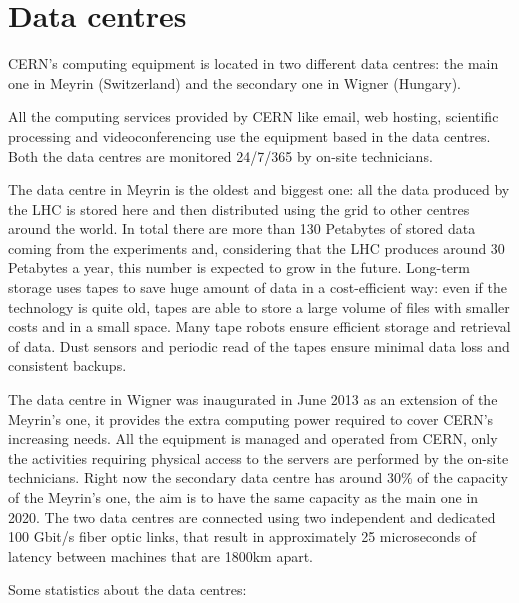 \section{Data centres}

CERN's computing equipment is located in two different data centres: the
main one in Meyrin (Switzerland) and the secondary one in Wigner
(Hungary).

All the computing services provided by CERN like email, web hosting,
scientific processing and videoconferencing use the equipment based in the
data centres. Both the data centres are monitored 24/7/365 by on-site
technicians.

The data centre in Meyrin is the oldest and biggest one: all the data
produced by the LHC is stored here and then distributed using the grid to
other centres around the world. In total there are more than 130 Petabytes
of stored data coming from the experiments and, considering that the LHC
produces around 30 Petabytes a year, this number is expected to grow in
the future. Long-term storage uses tapes to save huge amount of data in
a cost-efficient way: even if the technology is quite old, tapes are
able to store a large volume of files with smaller costs and in a small
space. Many tape robots ensure efficient storage and retrieval of data.
Dust sensors and periodic read of the tapes ensure minimal data loss and
consistent backups.

The data centre in Wigner was inaugurated in June 2013 as an extension of
the Meyrin's one, it provides the extra computing power required to cover
CERN's increasing needs. All the equipment is managed and operated from
CERN, only the activities requiring physical access to the servers are
performed by the on-site technicians. Right now the secondary data centre
has around 30\% of the capacity of the Meyrin's one, the aim is to have
the same capacity as the main one in 2020. The two data centres are
connected using two independent and dedicated 100 Gbit/s fiber optic
links, that result in approximately 25 microseconds of latency between
machines that are 1800km apart.

Some statistics about the data centres:

